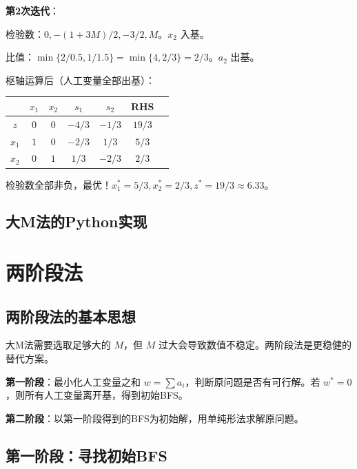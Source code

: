 \begin{example}
\textbf{第2次迭代}：

检验数：$0, -(1+3M)/2, -3/2, M$。$x_2$ 入基。

比值：$\min\{2/0.5, 1/1.5\} = \min\{4, 2/3\} = 2/3$。$a_2$ 出基。

枢轴运算后（人工变量全部出基）：

\begin{table}[H]
\centering
\begin{tabular}{@{}c|ccccc|c@{}}
\toprule
& $x_1$ & $x_2$ & $s_1$ & $s_2$ & RHS \\
\midrule
$z$ & $0$ & $0$ & $-4/3$ & $-1/3$ & $19/3$ \\
\midrule
$x_1$ & $1$ & $0$ & $-2/3$ & $1/3$ & $5/3$ \\
$x_2$ & $0$ & $1$ & $1/3$ & $-2/3$ & $2/3$ \\
\bottomrule
\end{tabular}
\end{table}

检验数全部非负，最优！$x_1^* = 5/3, x_2^* = 2/3, z^* = 19/3 \approx 6.33$。
\end{example}

\subsection{大M法的Python实现}\label{sec:bigM-code}

\section{两阶段法}\label{sec:twophase}

\subsection{两阶段法的基本思想}

大M法需要选取足够大的 $M$，但 $M$ 过大会导致数值不稳定。两阶段法是更稳健的替代方案。

\begin{conceptbox}[两阶段法]
\textbf{第一阶段}：最小化人工变量之和 $w = \sum a_i$，判断原问题是否有可行解。若 $w^* = 0$，则所有人工变量离开基，得到初始BFS。

\textbf{第二阶段}：以第一阶段得到的BFS为初始解，用单纯形法求解原问题。
\end{conceptbox}

\subsection{第一阶段：寻找初始BFS}

